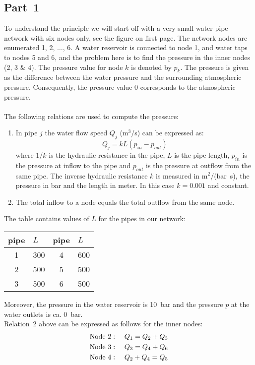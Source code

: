 \documentclass[11pt,a4paper]{article}
\begin{document}
\subsection*{Part~1}
To understand the principle we will start off with a very small water pipe network with six nodes only, see the figure on first page. The network nodes are enumerated 1, 2, $\ldots$, 6.  A water reservoir is connected to node 1, and water taps to nodes 5 and 6, and the problem here is to find the pressure in the inner nodes (2, 3 \& 4). The pressure value for node $k$ is denoted by $p_k$. The pressure is given as the difference between the water pressure and the surrounding atmospheric pressure. Consequently, the pressure value 0 corresponds to the atmospheric pressure.
\\
\\
The following relations are used to compute the pressure:
\begin{enumerate}
 \item In pipe $j$ the water flow speed $Q_j$ (m$^3$/s) can be expressed as:
\begin{equation}
 Q_j = k L \left(p_{in}-p_{out}\right)  \label{eq:Qj}
\end{equation}
where $1/k$ is the hydraulic resistance in the pipe, $L$ is the pipe length, $p_{in}$ is the pressure at inflow to the pipe and $p_{out}$ is the pressure at outflow from the same pipe. The inverse hydraulic resistance $k$ is measured in m$^2$/(bar\ s), the pressure in bar and the length in meter. In this case $k=0.001$ and constant. 
\item The total inflow to a node equals the total outflow from the same node.
\end{enumerate}

\noindent The table contains values of $L$ for the pipes in our network:
\par
\begin{center}
\begin{tabular}{|cl || cl |}\hline
pipe  & $L$   & pipe & $L$    \\ \hline
1       & 300   & 4      & 600   \\ \hline
2       & 500   & 5      & 500    \\ \hline
3       & 500   & 6      & 500    \\ \hline
\end{tabular}
\end{center}
\par
\noindent
Moreover, the pressure in the water reservoir is 10~bar and the pressure  $p$ at the water outlets is ca. 0~bar.
\\
\noindent Relation~2 above can be expressed as follows for the inner nodes:
\begin{eqnarray*}
\rm{Node\ 2:} &\ & Q_1 = Q_2 + Q_{3}\\
\rm{Node\ 3:} &\ & Q_3 = Q_4 + Q_6\\
\rm{Node\ 4:} &\ & Q_2 + Q_4  = Q_5
\end{eqnarray*}
\end{document}
